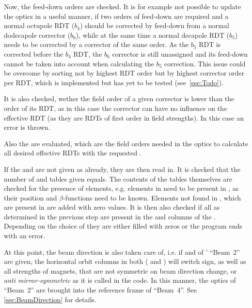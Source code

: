 \label{par:GetOrders}

Now, the feed-down orders are checked. 
It is for example not possible to update the optics in a useful manner, if two orders of feed-down are required and
a normal octupole RDT ($b_4$) should be corrected by feed-down from a normal dodecapole corrector ($b_6$), 
while at the same time a normal decapole RDT ($b_5$) needs to be corrected by a corrector of the same order.
As the $b_5$ RDT is corrected before the $b_4$ RDT, the $b_6$ corrector is still unassigned and its feed-down cannot 
be taken into account when calculating the $b_5$ correction.
This issue could be overcome by sorting not by highest RDT order but by highest corrector order per RDT, 
which is implemented but has yet to be tested (see~\cref{sec:Todo}).

It is also checked, wether the field order of a given corrector is lower than the order of its RDT, 
as in this case the corrector can have no influence on the effective RDT (as they are RDTs of first order in field strengths).
In this case an error is thrown.

Also the  are evaluated, which are the field orders needed in the optics to calculate all desired 
effective RDTs with the requested .



If the  and  are not given as  already, they are then read in.
It is checked that the number of  and  tables given equals.
The contents of the tables themselves are checked for the presence of elements, 
e.g. elements in  need to be present in , as their position and $\beta$-functions need to be known. 
Elements not found in , which are present in  are added with zero values.
It is then also checked if all  as determined in the previous step are present in the  and  columns of the
. Depending on the choice of  they are either filled with zeros or the program ends with an error.

At this point, the beam direction is also taken care of, i.e. if  and  of ' ``Beam~2'' are given, 
the horizontal orbit columns in both ( and ) will switch sign, as well as all strengths of magnets, 
that are not symmetric on beam direction change, or \textit{anti mirror-symmetric} as it is called in the code.
In this manner, the optics of ``Beam~2'' are brought into the reference frame of ``Beam~4''.
See \cref{sec:BeamDirection} for details.

